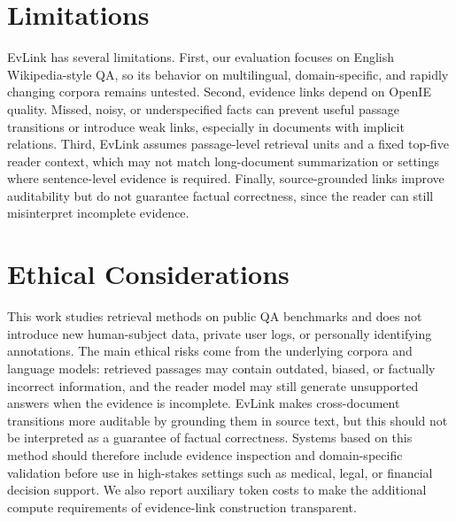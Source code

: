 \section*{Limitations}
\label{sec:limitations}

EvLink has several limitations. First, our evaluation focuses on English
Wikipedia-style QA, so its behavior on multilingual, domain-specific, and
rapidly changing corpora remains untested. Second, evidence links depend on
OpenIE quality. Missed, noisy, or underspecified facts can prevent useful
passage transitions or introduce weak links, especially in documents with
implicit relations. Third, EvLink assumes passage-level retrieval units and a
fixed top-five reader context, which may not match long-document summarization
or settings where sentence-level evidence is required. Finally, source-grounded links improve auditability but do not guarantee factual correctness, since the reader can still misinterpret incomplete evidence.

\section*{Ethical Considerations}

This work studies retrieval methods on public QA benchmarks and does
not introduce new human-subject data, private user logs, or personally
identifying annotations. The main ethical risks come from the underlying
corpora and language models: retrieved passages may contain outdated,
biased, or factually incorrect information, and the reader model may
still generate unsupported answers when the evidence is incomplete.
EvLink makes cross-document transitions more auditable by grounding
them in source text, but this should not be interpreted as a guarantee
of factual correctness. Systems based on this method should therefore
include evidence inspection and domain-specific validation before use in
high-stakes settings such as medical, legal, or financial decision
support. We also report auxiliary token costs to make the additional
compute requirements of evidence-link construction transparent.
